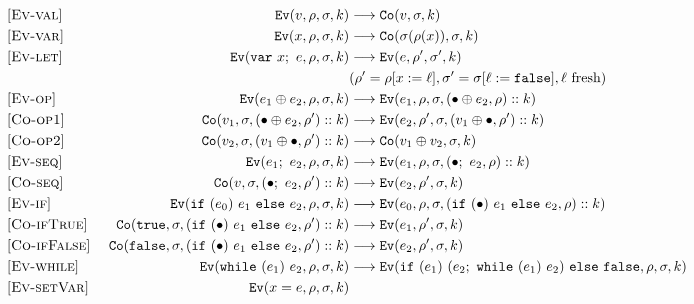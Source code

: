 \begin{figure*}
  \begin{center}
\begin{align*}
  \omit [\textsc{Ev-val}] &&
    \c{Ev}(v, \rho, \sigma, k)
    & \longrightarrow
    \c{Co}(v, \sigma, k)
\\
  \omit [\textsc{Ev-var}] &&
    \c{Ev}(x, \rho, \sigma, k)
    & \longrightarrow
    \c{Co}(\sigma(\rho(x)), \sigma, k)
\\
  \omit [\textsc{Ev-let}] &&
    \c{Ev}(\c{var}~x;~e, \rho, \sigma, k)
    & \longrightarrow
    \c{Ev}(e, \rho', \sigma', k) 
        \\ &&& (\rho' = \rho[x := \ell], \sigma' = \sigma[\ell := \c{false}], \ell~\mbox{fresh})
\\
  \omit [\textsc{Ev-op}] &&
    \c{Ev}(e_1 \oplus  e_2, \rho, \sigma, k)
    & \longrightarrow
    \c{Ev}(e_1, \rho, \sigma, (\bullet \oplus e_2,\rho)::k)
\\
  \omit [\textsc{Co-op1}] &&
    \c{Co}(v_1, \sigma, (\bullet \oplus e_2,\rho')::k)
    & \longrightarrow
    \c{Ev}(e_2, \rho', \sigma, (v_1\oplus \bullet,\rho')::k)
\\
  \omit [\textsc{Co-op2}] &&
    \c{Co}(v_2, \sigma, (v_1 \oplus \bullet,\rho')::k)
    & \longrightarrow
    \c{Co}(v_1 \oplus v_2, \sigma, k)
\\
  \omit [\textsc{Ev-seq}] &&
    \c{Ev}(e_1;~e_2, \rho, \sigma, k)
    & \longrightarrow
    \c{Ev}(e_1, \rho, \sigma, \then{e_2}{\rho}::k)
\\
  \omit [\textsc{Co-seq}] &&
    \c{Co}(v, \sigma, \then{e_2}{\rho'}::k)
    & \longrightarrow
    \c{Ev}(e_2, \rho', \sigma, k)
\\
  \omit [\textsc{Ev-if}] &&
    \c{Ev}(\c{if}~(e_0)~e_1~\c{else}~e_2, \rho, \sigma, k)
    & \longrightarrow
    \c{Ev}(e_0, \rho, \sigma, \branch{e_1}{e_2}{\rho}::k)
\\
  \omit [\textsc{Co-ifTrue}] &&
    \c{Co}(\c{true}, \sigma, \branch{e_1}{e_2}{\rho'}::k)
    & \longrightarrow
    \c{Ev}(e_1, \rho', \sigma, k)
\\
  \omit [\textsc{Co-ifFalse}] &&
    \c{Co}(\c{false}, \sigma, \branch{e_1}{e_2}{\rho'}::k)
    & \longrightarrow
    \c{Ev}(e_2, \rho', \sigma, k)
\\
  \omit [\textsc{Ev-while}] &&
    \c{Ev}(\c{while}~(e_1)~e_2, \rho, \sigma, k)
    & \longrightarrow
    \c{Ev}(\c{if}~(e_1)~(e_2;~ \c{while}~(e_1)~e_2)~\c{else}~\c{false}, \rho, \sigma, k)
\\
  \omit [\textsc{Ev-setVar}] &&
    \c{Ev}(x = e, \rho, \sigma, k)

\end{align*}
\end{center}
\end{figure*}
